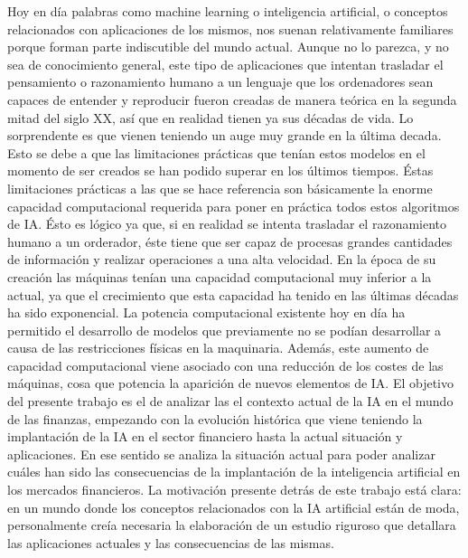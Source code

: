 \documentclass[]{DissertateUSU}
\begin{document}
\noindent Hoy en día palabras como machine learning o inteligencia
artificial, o conceptos relacionados con aplicaciones de los mismos, nos
suenan relativamente familiares porque forman parte indiscutible del
mundo actual. Aunque no lo parezca, y no sea de conocimiento general,
este tipo de aplicaciones que intentan trasladar el pensamiento o
razonamiento humano a un lenguaje que los ordenadores sean capaces de
entender y reproducir fueron creadas de manera teórica en la segunda
mitad del siglo XX, así que en realidad tienen ya sus décadas de vida.
Lo sorprendente es que vienen teniendo un auge muy grande en la última
decada. Esto se debe a que las limitaciones prácticas que tenían estos
modelos en el momento de ser creados se han podido superar en los
últimos tiempos. Éstas limitaciones prácticas a las que se hace
referencia son básicamente la enorme capacidad computacional requerida
para poner en práctica todos estos algoritmos de IA. Ésto es lógico ya
que, si en realidad se intenta trasladar el razonamiento humano a un
orderador, éste tiene que ser capaz de procesas grandes cantidades de
información y realizar operaciones a una alta velocidad. En la época de
su creación las máquinas tenían una capacidad computacional muy inferior
a la actual, ya que el crecimiento que esta capacidad ha tenido en las
últimas décadas ha sido exponencial. La potencia computacional existente
hoy en día ha permitido el desarrollo de modelos que previamente no se
podían desarrollar a causa de las restricciones físicas en la
maquinaria. Además, este aumento de capacidad computacional viene
asociado con una reducción de los costes de las máquinas, cosa que
potencia la aparición de nuevos elementos de IA. El objetivo del
presente trabajo es el de analizar las el contexto actual de la IA en el
mundo de las finanzas, empezando con la evolución histórica que viene
teniendo la implantación de la IA en el sector financiero hasta la
actual situación y aplicaciones. En ese sentido se analiza la situación
actual para poder analizar cuáles han sido las consecuencias de la
implantación de la inteligencia artificial en los mercados financieros.
La motivación presente detrás de este trabajo está clara: en un mundo
donde los conceptos relacionados con la IA artificial están de moda,
personalmente creía necesaria la elaboración de un estudio riguroso que
detallara las aplicaciones actuales y las consecuencias de las mismas.

\justifying
\end{document}
